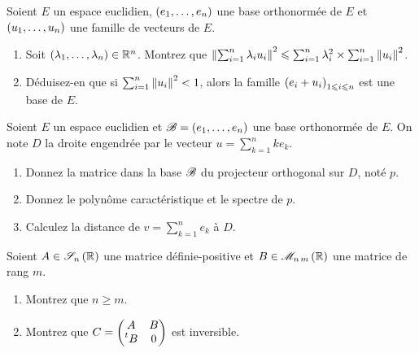 \begin{exo}
Soient \(E\) un espace euclidien, \(\left(e_1,\dots,e_n\right)\) une base orthonormée de \(E\) et \(\left(u_1,\dots,u_n\right)\) une famille de vecteurs de \(E\).

\begin{enumerate}
    \item Soit \(\left(\lambda_1,\dots,\lambda_n\right)\in\mathbb{R}^n\). Montrez que \(\norme{\sum_{i=1}^n\lambda_iu_i}^2\leq\sum_{i=1}^n\lambda_i^2\times\sum_{i=1}^n\norme{u_i}^2\). \\
    \item Déduisez-en que si \(\sum_{i=1}^n\norme{u_i}^2<1\), alors la famille \(\left(e_i+u_i\right)_{1\leqslant i\leqslant n}\) est une base de \(E\).
\end{enumerate}
\end{exo}

\begin{exo}
Soient \(E\) un espace euclidien et \(\mathscr{B}=\left(e_1,\dots,e_n\right)\) une base orthonormée de \(E\). On note \(D\) la droite engendrée par le vecteur \(u=\sum_{k=1}^nke_k\).

\begin{enumerate}
    \item Donnez la matrice dans la base \(\mathscr{B}\) du projecteur orthogonal sur \(D\), noté \(p\). \\
    \item Donnez le polynôme caractéristique et le spectre de \(p\). \\
    \item Calculez la distance de \(v=\sum_{k=1}^ne_k\) à \(D\).
\end{enumerate}
\end{exo}

\begin{exo}
Soient \(A\in\sym{n}[\R]\) une matrice définie-positive et \(B\in\M{n\,m}[\R]\) une matrice de rang \(m\).

\begin{enumerate}
    \item Montrez que \(n\geq m\). \\
    \item Montrez que \(C=\begin{pmatrix}
        A & B \\
        \prescript{t}{}{B} & 0
    \end{pmatrix}\) est inversible.
\end{enumerate}
\end{exo}

